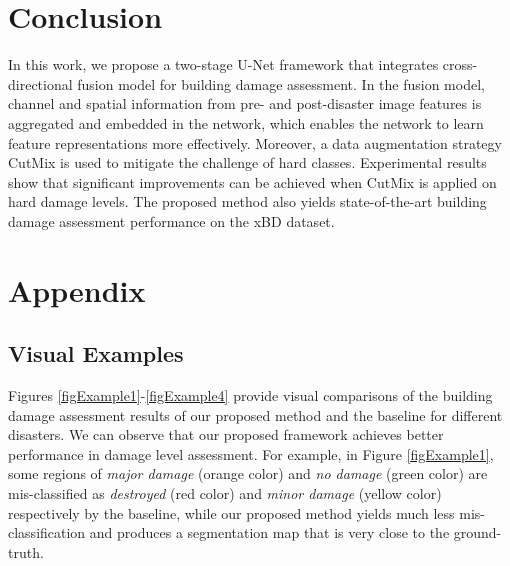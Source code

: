 \documentclass{article}
\begin{document}
\section{Conclusion}
In this work, we propose a two-stage U-Net framework that integrates cross-directional fusion model for building damage assessment. In the fusion model, channel and spatial information from pre- and post-disaster image features is aggregated and embedded in the network, which enables the network to learn feature representations more effectively. Moreover, a data augmentation strategy CutMix is used to mitigate the challenge of hard classes. Experimental results show that significant improvements can be achieved when CutMix is applied on hard damage levels. The proposed method also yields state-of-the-art building damage assessment performance on the xBD dataset. 





















\clearpage
\appendix
\section{Appendix}


\subsection{Visual Examples}
Figures \ref{figExample1}-\ref{figExample4} provide visual comparisons of the building damage assessment results of our proposed method and the baseline for different disasters. We can observe that our proposed framework achieves better performance in damage level assessment. For example, in Figure \ref{figExample1}, some regions of \textit{major damage} (orange color) and \textit{no damage} (green color) are mis-classified as \textit{destroyed} (red color) and \textit{minor damage} (yellow color) respectively by the baseline, while our proposed method yields much less mis-classification and produces a segmentation map that is very close to the ground-truth.
\end{document}
